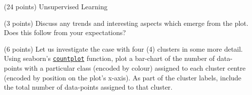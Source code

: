 \documentclass[12pt]{article}
\begin{document}
\begin{question}{\label{Q_UNSUP_LEARN}(24 points) Unsupervised Learning}
\begin{subquestion}
\end{subquestion}

\begin{subquestion}{\label{Q_CLUSTER_TRENDS}(3 points) Discuss any trends and interesting aspects which emerge from the plot. Does this follow from your expectations?}






\end{subquestion}

\begin{subquestion}{\label{Q_CLUSTER_FOUR}(6 points) Let us investigate the case with four (4) clusters in some more detail. Using seaborn's \href{https://seaborn.pydata.org/generated/seaborn.countplot.html}{\texttt{countplot}} function, plot a bar-chart of the number of data-points with a particular class (encoded by colour) assigned to each cluster centre (encoded by position on the plot's x-axis). As part of the cluster labels, include the total number of data-points assigned to that cluster.}







\end{subquestion}
\end{question}
\end{document}
